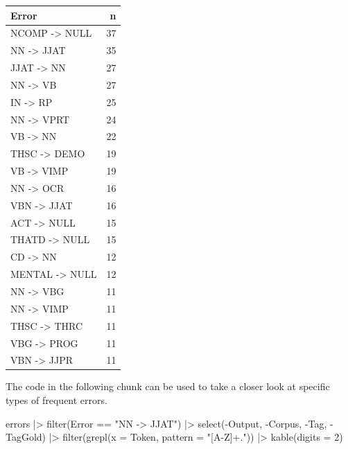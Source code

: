 \documentclass[
  letterpaper,
  DIV=11,
  numbers=noendperiod]{scrreprt}
\newenvironment{Shaded}{\begin{snugshade}}{\end{snugshade}}
\newcommand{\AttributeTok}[1]{\textcolor[rgb]{0.40,0.45,0.13}{#1}}
\newcommand{\DecValTok}[1]{\textcolor[rgb]{0.68,0.00,0.00}{#1}}
\newcommand{\FunctionTok}[1]{\textcolor[rgb]{0.28,0.35,0.67}{#1}}
\newcommand{\NormalTok}[1]{\textcolor[rgb]{0.00,0.23,0.31}{#1}}
\newcommand{\SpecialCharTok}[1]{\textcolor[rgb]{0.37,0.37,0.37}{#1}}
\newcommand{\StringTok}[1]{\textcolor[rgb]{0.13,0.47,0.30}{#1}}
\begin{document}
\begin{longtable}[]{@{}lr@{}}
\toprule\noalign{}
Error & n \\
\midrule\noalign{}
\endhead
\bottomrule\noalign{}
\endlastfoot
NCOMP -\textgreater{} NULL & 37 \\
NN -\textgreater{} JJAT & 35 \\
JJAT -\textgreater{} NN & 27 \\
NN -\textgreater{} VB & 27 \\
IN -\textgreater{} RP & 25 \\
NN -\textgreater{} VPRT & 24 \\
VB -\textgreater{} NN & 22 \\
THSC -\textgreater{} DEMO & 19 \\
VB -\textgreater{} VIMP & 19 \\
NN -\textgreater{} OCR & 16 \\
VBN -\textgreater{} JJAT & 16 \\
ACT -\textgreater{} NULL & 15 \\
THATD -\textgreater{} NULL & 15 \\
CD -\textgreater{} NN & 12 \\
MENTAL -\textgreater{} NULL & 12 \\
NN -\textgreater{} VBG & 11 \\
NN -\textgreater{} VIMP & 11 \\
THSC -\textgreater{} THRC & 11 \\
VBG -\textgreater{} PROG & 11 \\
VBN -\textgreater{} JJPR & 11 \\
\end{longtable}

The code in the following chunk can be used to take a closer look at
specific types of frequent errors.

\begin{Shaded}
\begin{Highlighting}[]
\NormalTok{errors }\SpecialCharTok{|\textgreater{}} 
  \FunctionTok{filter}\NormalTok{(Error }\SpecialCharTok{==} \StringTok{"NN {-}\textgreater{} JJAT"}\NormalTok{) }\SpecialCharTok{|\textgreater{}} 
  \FunctionTok{select}\NormalTok{(}\SpecialCharTok{{-}}\NormalTok{Output, }\SpecialCharTok{{-}}\NormalTok{Corpus, }\SpecialCharTok{{-}}\NormalTok{Tag, }\SpecialCharTok{{-}}\NormalTok{TagGold) }\SpecialCharTok{|\textgreater{}} 
  \FunctionTok{filter}\NormalTok{(}\FunctionTok{grepl}\NormalTok{(}\AttributeTok{x =}\NormalTok{ Token, }\AttributeTok{pattern =} \StringTok{"[A{-}Z]+."}\NormalTok{)) }\SpecialCharTok{|\textgreater{}} 
  \FunctionTok{kable}\NormalTok{(}\AttributeTok{digits =} \DecValTok{2}\NormalTok{)}
\end{Highlighting}
\end{Shaded}
\end{document}
